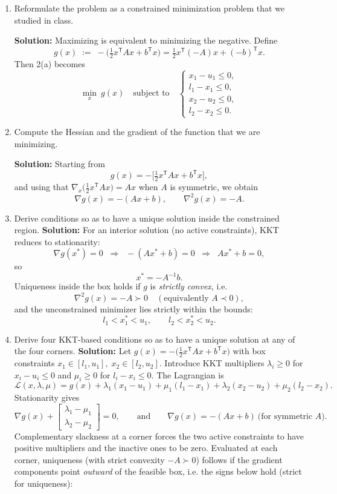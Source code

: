 \documentclass[11pt]{article}
\begin{document}
	\begin{enumerate}[label=2(\alph*)]
		\item Reformulate the problem as a constrained minimization problem that we studied in class.
		
		\textbf{Solution:}
		Maximizing is equivalent to minimizing the negative. Define
		\[
		g(x)\;:=\;-\Big(\tfrac{1}{2}x^{\mathsf T} A x + b^{\mathsf T} x\Big)
		= \tfrac{1}{2}x^{\mathsf T}(-A)x + (-b)^{\mathsf T}x.
		\]
		Then 2(a) becomes
		\[
		\min_{x}\ g(x)
		\quad \text{subject to} \quad
		\begin{cases}
			x_1 - u_1 \le 0,\\
			l_1 - x_1 \le 0,\\
			x_2 - u_2 \le 0,\\
			l_2 - x_2 \le 0.
		\end{cases}
		\]

		\item Compute the Hessian and the gradient of the function that we are minimizing.
		
		\textbf{Solution:}  
		Starting from 
		\[
		g(x) = -\Big[\tfrac{1}{2} x^{\mathsf T} A x + b^{\mathsf T} x\Big],
		\]
		and using that $\nabla_x \big(\tfrac{1}{2} x^{\mathsf T} A x\big) = A x$ when $A$ is symmetric, we obtain
		\[
		\nabla g(x) = -(A x + b), \qquad
		\nabla^{2} g(x) = -A.
		\]
		
		\item Derive conditions so as to have a unique solution inside the constrained region.
		\textbf{Solution:}
		For an interior solution (no active constraints), KKT reduces to stationarity:
		\[
		\nabla g(x^*)=0 \;\;\Longrightarrow\;\; -(A x^* + b)=0 \;\;\Longrightarrow\;\; A x^* + b = 0,
		\]
		so
		\[
		x^* = -A^{-1} b.
		\]
		Uniqueness inside the box holds if $g$ is \emph{strictly convex}, i.e.
		\[
		\nabla^2 g(x) = -A \succ 0 \quad (\text{equivalently } A \prec 0),
		\]
		and the unconstrained minimizer lies strictly within the bounds:
		\[
		l_1 < x^*_1 < u_1, \qquad l_2 < x^*_2 < u_2.
		\]

		\item Derive four KKT-based conditions so as to have a unique solution at any of the four corners.
		\textbf{Solution:}
		Let $g(x) = -\big(\tfrac{1}{2}x^{\mathsf T} A x + b^{\mathsf T} x\big)$ with box constraints
		$x_1 \in [l_1,u_1],\; x_2 \in [l_2,u_2]$.
		Introduce KKT multipliers $\lambda_i \ge 0$ for $x_i - u_i \le 0$ and $\mu_i \ge 0$ for $l_i - x_i \le 0$.
		The Lagrangian is
		\[
		\mathcal{L}(x,\lambda,\mu)=g(x)+\lambda_1(x_1-u_1)+\mu_1(l_1-x_1)+\lambda_2(x_2-u_2)+\mu_2(l_2-x_2).
		\]
		Stationarity gives
		\[
		\nabla g(x) + 
		\begin{bmatrix}
			\lambda_1-\mu_1\\
			\lambda_2-\mu_2
		\end{bmatrix}
		= 0,
		\qquad\text{and}\qquad
		\nabla g(x)=-(A x + b)\ \text{(for symmetric $A$)}.
		\]
		Complementary slackness at a corner forces the two active constraints to have positive multipliers and the inactive ones to be zero. Evaluated at each corner, uniqueness (with strict convexity $-A \succ 0$) follows if the gradient components point \emph{outward} of the feasible box, i.e. the signs below hold (strict for uniqueness):
		

\end{enumerate}
\end{document}
